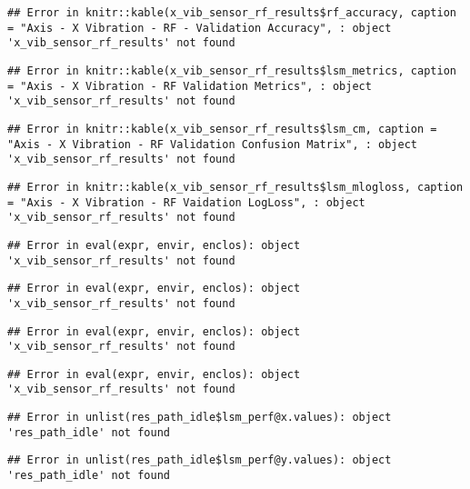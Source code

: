 \documentclass[]{article}
\begin{document}
\begin{verbatim}
## Error in knitr::kable(x_vib_sensor_rf_results$rf_accuracy, caption = "Axis - X Vibration - RF - Validation Accuracy", : object 'x_vib_sensor_rf_results' not found
\end{verbatim}

\begin{verbatim}
## Error in knitr::kable(x_vib_sensor_rf_results$lsm_metrics, caption = "Axis - X Vibration - RF Validation Metrics", : object 'x_vib_sensor_rf_results' not found
\end{verbatim}

\begin{verbatim}
## Error in knitr::kable(x_vib_sensor_rf_results$lsm_cm, caption = "Axis - X Vibration - RF Validation Confusion Matrix", : object 'x_vib_sensor_rf_results' not found
\end{verbatim}

\begin{verbatim}
## Error in knitr::kable(x_vib_sensor_rf_results$lsm_mlogloss, caption = "Axis - X Vibration - RF Vaidation LogLoss", : object 'x_vib_sensor_rf_results' not found
\end{verbatim}

\begin{verbatim}
## Error in eval(expr, envir, enclos): object 'x_vib_sensor_rf_results' not found
\end{verbatim}

\begin{verbatim}
## Error in eval(expr, envir, enclos): object 'x_vib_sensor_rf_results' not found
\end{verbatim}

\begin{verbatim}
## Error in eval(expr, envir, enclos): object 'x_vib_sensor_rf_results' not found
\end{verbatim}

\begin{verbatim}
## Error in eval(expr, envir, enclos): object 'x_vib_sensor_rf_results' not found
\end{verbatim}

\begin{verbatim}
## Error in unlist(res_path_idle$lsm_perf@x.values): object 'res_path_idle' not found
\end{verbatim}

\begin{verbatim}
## Error in unlist(res_path_idle$lsm_perf@y.values): object 'res_path_idle' not found
\end{verbatim}
\end{document}
